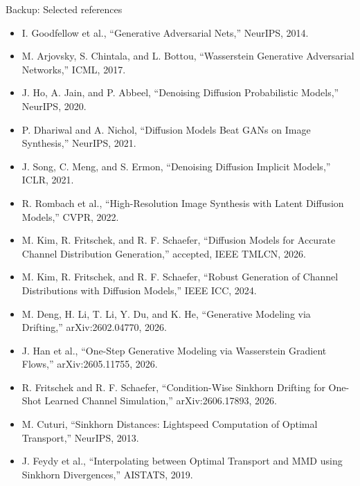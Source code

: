 \documentclass[aspectratio=169,10pt]{beamer}
\begin{document}
\begin{frame}{Backup: Selected references}
\scriptsize
\begin{itemize}\setlength\itemsep{0.35em}
\item I. Goodfellow et al., ``Generative Adversarial Nets,'' NeurIPS, 2014.
\item M. Arjovsky, S. Chintala, and L. Bottou, ``Wasserstein Generative Adversarial Networks,'' ICML, 2017.
\item J. Ho, A. Jain, and P. Abbeel, ``Denoising Diffusion Probabilistic Models,'' NeurIPS, 2020.
\item P. Dhariwal and A. Nichol, ``Diffusion Models Beat GANs on Image Synthesis,'' NeurIPS, 2021.
\item J. Song, C. Meng, and S. Ermon, ``Denoising Diffusion Implicit Models,'' ICLR, 2021.
\item R. Rombach et al., ``High-Resolution Image Synthesis with Latent Diffusion Models,'' CVPR, 2022.
\item M. Kim, R. Fritschek, and R. F. Schaefer, ``Diffusion Models for Accurate Channel Distribution Generation,'' accepted, IEEE TMLCN, 2026.
\item M. Kim, R. Fritschek, and R. F. Schaefer, ``Robust Generation of Channel Distributions with Diffusion Models,'' IEEE ICC, 2024.
\item M. Deng, H. Li, T. Li, Y. Du, and K. He, ``Generative Modeling via Drifting,'' arXiv:2602.04770, 2026.
\item J. Han et al., ``One-Step Generative Modeling via Wasserstein Gradient Flows,'' arXiv:2605.11755, 2026.
\item R. Fritschek and R. F. Schaefer, ``Condition-Wise Sinkhorn Drifting for One-Shot Learned Channel Simulation,'' arXiv:2606.17893, 2026.
\item M. Cuturi, ``Sinkhorn Distances: Lightspeed Computation of Optimal Transport,'' NeurIPS, 2013.
\item J. Feydy et al., ``Interpolating between Optimal Transport and MMD using Sinkhorn Divergences,'' AISTATS, 2019.
\end{itemize}
\end{frame}
\end{document}
